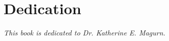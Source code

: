 \section{Dedication}
\vspace{4in}
\begin{center}
   \textit{This book is dedicated to Dr. Katherine E. Magurn.} 
\end{center}

    
